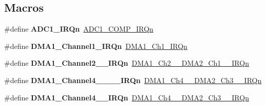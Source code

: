\subsection*{Macros}
\begin{DoxyCompactItemize}
\item 
\mbox{\label{group__stm32f091xc_gaa7d642ec0ffe7089d01841fe5992321c}} 
\#define {\bfseries A\+D\+C1\+\_\+\+I\+R\+Qn}~\hyperlink{group___peripheral__interrupt__number__definition_gga7e1129cd8a196f4284d41db3e82ad5c8a1f21d9fac09be01d78b835759e21d012}{A\+D\+C1\+\_\+\+C\+O\+M\+P\+\_\+\+I\+R\+Qn}
\item 
\mbox{\label{group__stm32f091xc_ga999899580f6a50ba6bee8ce4e54fbb59}} 
\#define {\bfseries D\+M\+A1\+\_\+\+Channel1\+\_\+\+I\+R\+Qn}~\hyperlink{group___peripheral__interrupt__number__definition_gga7e1129cd8a196f4284d41db3e82ad5c8a4f148c67dcf6bd03e830335c97f42b9b}{D\+M\+A1\+\_\+\+Ch1\+\_\+\+I\+R\+Qn}
\item 
\mbox{\label{group__stm32f091xc_ga0823b3bd6bcb2e00c1b4439fb912c73d}} 
\#define {\bfseries D\+M\+A1\+\_\+\+Channel2\+\_\+\_\+\+I\+R\+Qn}~\hyperlink{group___peripheral__interrupt__number__definition_gga7e1129cd8a196f4284d41db3e82ad5c8ae02e0acdda90324039b22c1a5e990990}{D\+M\+A1\+\_\+\+Ch2\+\_\+\_\+\+D\+M\+A2\+\_\+\+Ch1\+\_\+\_\+\+I\+R\+Qn}
\item 
\mbox{\label{group__stm32f091xc_gabba6cf96bd31658213f35354cf700b31}} 
\#define {\bfseries D\+M\+A1\+\_\+\+Channel4\+\_\+\_\+\_\+\_\+\+I\+R\+Qn}~\hyperlink{group___peripheral__interrupt__number__definition_gga7e1129cd8a196f4284d41db3e82ad5c8abb8480db798ed2e4a88687e128eecb88}{D\+M\+A1\+\_\+\+Ch4\+\_\+\_\+\+D\+M\+A2\+\_\+\+Ch3\+\_\+\_\+\+I\+R\+Qn}
\item 
\mbox{\label{group__stm32f091xc_ga35a41592e06a61cdced6514b54e1ceb3}} 
\#define {\bfseries D\+M\+A1\+\_\+\+Channel4\+\_\+\_\+\+I\+R\+Qn}~\hyperlink{group___peripheral__interrupt__number__definition_gga7e1129cd8a196f4284d41db3e82ad5c8abb8480db798ed2e4a88687e128eecb88}{D\+M\+A1\+\_\+\+Ch4\+\_\+\_\+\+D\+M\+A2\+\_\+\+Ch3\+\_\+\_\+\+I\+R\+Qn}
\item 
\mbox{\label{group__stm32f091xc_gaf016a2890375aa890497fa1965dae1f0}} 

\end{DoxyCompactItemize}
